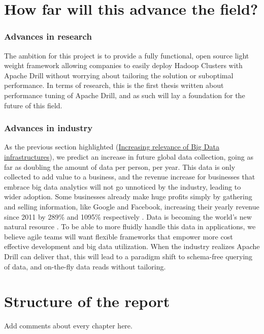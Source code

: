 \documentclass[a4paper,english]{report}
\begin{document}
		\section{How far will this advance the field?}
			\subsubsection{Advances in research}
			The ambition for this project is to provide a fully functional, open source light weight framework allowing companies to easily deploy Hadoop Clusters with Apache Drill without worrying about tailoring the solution or suboptimal performance. In terms of research, this is the first thesis written about performance tuning of Apache Drill, and as such will lay a foundation for the future of this field.
			\subsubsection{Advances in industry}
			As the previous section highlighted (\hyperref[big_data]{Increasing relevance of Big Data infrastructures}), we predict an increase in future global data collection, going as far as doubling the amount of data per person, per year. This data is only collected to add value to a business, and the revenue increase for businesses that embrace big data analytics will not go unnoticed by the industry, leading to wider adoption. Some businesses already make huge profits simply by gathering and selling information, like Google and Facebook, increasing their yearly revenue since 2011 by 289\% and 1095\% respectively \cite{statista}. Data is becoming the world’s new natural resource \cite{future_data}. To be able to more fluidly handle this data in applications, we believe agile teams will want flexible frameworks that empower more cost effective development and big data utilization. When the industry realizes Apache Drill can deliver that, this will lead to a paradigm shift to schema-free querying of data, and on-the-fly data reads without tailoring.
		
		\section{Structure of the report}
		Add comments about every chapter here.

		
\end{document}
